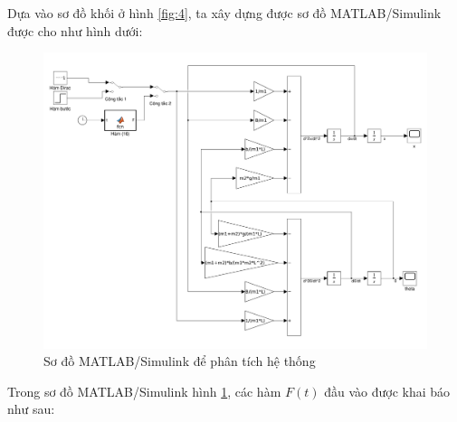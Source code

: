 \documentclass[12pt,a4paper]{article}
\begin{document}
Dựa vào sơ đồ khối ở hình \ref{fig:4}, ta xây dựng được sơ đồ MATLAB/Simulink được cho như hình dưới: 
\newpage
\begin{figure}[ht]
    \centering
    \includegraphics[width=\linewidth]{MATLAB_1.pdf}
    \caption{Sơ đồ MATLAB/Simulink để phân tích hệ thống}
    \label{fig:m1}
\end{figure}
Trong sơ đồ MATLAB/Simulink hình \ref{fig:m1}, các hàm $F(t)$ đầu vào được khai báo như sau:
\end{document}
